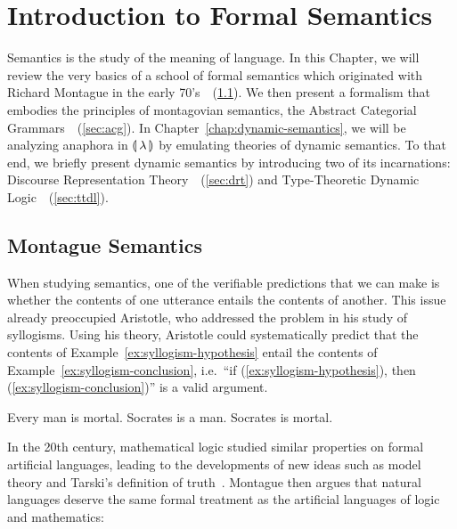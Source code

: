 \chapter{Introduction to Formal Semantics}
\label{chap:intro-fs}

Semantics is the study of the meaning of language. In this Chapter, we will
review the very basics of a school of formal semantics which originated
with Richard Montague in the early
70's~\cite{montague1970english,montague1970universal,montague1973proper}~(\ref{sec:montague}). We
then present a formalism that embodies the principles of montagovian
semantics, the Abstract Categorial
Grammars~\cite{de2001towards}~(\ref{sec:acg}). In
Chapter~\ref{chap:dynamic-semantics}, we will be analyzing anaphora in
${\llparenthesis \, \lambda \, \rrparenthesis}$ by emulating theories of dynamic semantics. To that end, we briefly
present dynamic semantics by introducing two of its incarnations: Discourse
Representation Theory~\cite{kamp1993discourse}~(\ref{sec:drt}) and
Type-Theoretic Dynamic
Logic~\cite{de2006towards,lebedeva2012expression}~(\ref{sec:ttdl}).

\minitoc


\section{Montague Semantics}
\label{sec:montague}

When studying semantics, one of the verifiable predictions that we can make
is whether the contents of one utterance entails the contents of
another. This issue already preoccupied Aristotle, who addressed the
problem in his study of syllogisms. Using his theory, Aristotle could
systematically predict that the contents of
Example~\ref{ex:syllogism-hypothesis} entail the contents of
Example~\ref{ex:syllogism-conclusion}, i.e.\ ``if
(\ref{ex:syllogism-hypothesis}), then (\ref{ex:syllogism-conclusion})'' is
a valid argument.

\begin{exe}
  \ex Every man is mortal. Socrates is a man. \label{ex:syllogism-hypothesis}
  \ex Socrates is mortal. \label{ex:syllogism-conclusion}
\end{exe}

In the 20th century, mathematical logic studied similar properties on
formal artificial languages, leading to the developments of new ideas such
as model theory and Tarski's definition of
truth~\cite{sep-tarski-truth,tarski1986arithmetical}. Montague then argues
that natural languages deserve the same formal treatment as the artificial
languages of logic and mathematics:

